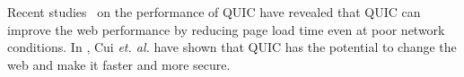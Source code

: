 Recent studies~\cite{Megyesi2016, Carlucci,Lychev2015,Biswal2016} on the performance of QUIC have revealed that QUIC can improve the web performance by reducing page load time even at poor network conditions. 
%
In \cite{Cui2017}, Cui \textit{et. al.} have shown that QUIC has the potential to change the web and make it faster and more secure. 
